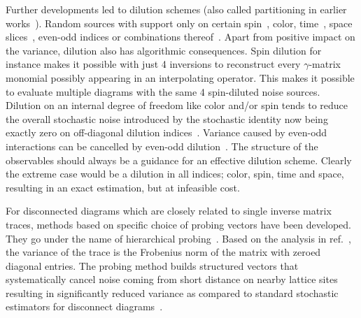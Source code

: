 Further developments led to dilution schemes (also called partitioning in earlier works~\cite{Wilcox:1999ab}).
Random sources with support only on certain spin~\cite{Wilcox:1997rm,Alexandrou:2010jr}, color, time~\cite{GUSKEN1989,OCais:2004xgm,Bali:2014pva}, space slices~\cite{Foley:2005ac}, even-odd indices or combinations thereof~\cite{Morningstar:2008mc,Bulava:2008qx,Foley:2010vv,Morningstar:2008ph}.
Apart from positive impact on the variance, dilution also has algorithmic consequences.
Spin dilution for instance makes it possible with just \num{4} inversions to reconstruct every $\gamma$-matrix monomial possibly appearing in an interpolating operator.
This makes it possible to evaluate multiple diagrams with the same \num{4} spin-diluted noise sources.
Dilution on an internal degree of freedom like color and/or spin tends to reduce the overall stochastic noise introduced by the stochastic identity now being exactly zero on off-diagonal dilution indices~\cite{Babich:2010at,Morningstar:2011ka}.
Variance caused by even-odd interactions can be cancelled by even-odd dilution~\cite{Bali_2009,Foley:2005ac,Morningstar:2011ka}.
The structure of the observables should always be a guidance for an effective dilution scheme.
Clearly the extreme case would be a dilution in all indices; color, spin, time and space, resulting in an exact estimation, but at infeasible cost.

For disconnected diagrams which are closely related to single inverse matrix traces, methods based on specific choice of probing vectors have been developed.
They go under the name of hierarchical probing~\cite{tang2012probing,Stathopoulos:2013aci}.
Based on the analysis in ref.~\cite{Hutchinson01011990}, the variance of the trace is the Frobenius norm of the matrix with zeroed diagonal entries.
The probing method builds structured vectors that systematically cancel noise coming from short distance on nearby lattice sites resulting in significantly reduced variance as compared to standard stochastic estimators for disconnect diagrams~\cite{Stathopoulos:2013aci}.


